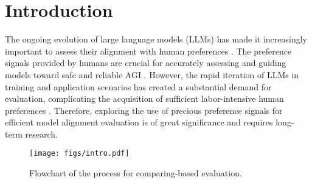 \section{Introduction}




The ongoing evolution of large language models (LLMs) has made it increasingly important to assess their alignment with human preferences \citep{alpacaeval,judging}. 
The preference signals provided by humans are crucial for accurately assessing and guiding models toward safe and reliable AGI \citep{safe,survey}. 
However, the rapid iteration of LLMs in training and application scenarios has created a substantial demand for evaluation, complicating the acquisition of sufficient labor-intensive human preferences \citep{arena,ultra}. 
Therefore, exploring the use of precious preference signals for efficient model alignment evaluation is of great significance and requires long-term research.




\begin{figure}[ht]
\begin{center}
\texttt{[image: figs/intro.pdf]}
\end{center}
\vspace{-0.2cm}
\caption{Flowchart of the process for comparing-based evaluation. }
\vspace{-0.2cm}
\label{fig:intro}
\end{figure}

